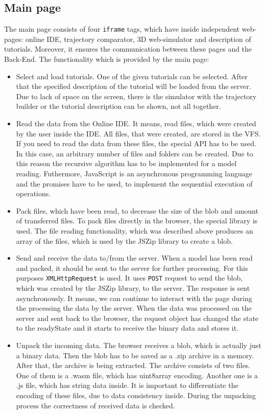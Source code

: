 \subsection{Main page}
The main page consists of four \texttt{iframe} tags, which have inside independent web-pages: online IDE, trajectory comparator, 3D web-simulator and description of tutorials. Moreover, it ensures the communication between these pages and the Back-End. The functionality which is provided by the main page:
\begin{itemize}
    \item Select and load tutorials. One of the given tutorials can be selected. After that the specified description of the tutorial will be loaded from the server. Due to lack of space on the screen, there is the simulator with the trajectory builder or the tutorial description can be shown, not all together.
    \item Read the data from the Online IDE. It means, read files, which were created by the user inside the IDE. All files, that were created, are stored in the VFS. If you need to read the data from these files, the special API \cite{FilesystemAPI} has to be used. In this case, an arbitrary number of files and folders can be created. Due to this reason the recursive algorithm has to be implemented for a model reading. Futhermore, JavaScript is an asynchronous programming language and the promises \cite{JSPromise} have to be used, to implement the sequential execution of operations.
    \item Pack files, which have been read, to decrease the size of the blob and amount of transferred files. To pack files directly in the browser, the special library is used. The file reading functionality, which was described above produces an array of the files, which is used by the JSZip library \cite{JSZip} to create a blob.
    \item Send and receive the data to/from the server. When a model has been read and packed, it should be sent to the server for further processing. For this purposes \texttt{XMLHttpRequest} \cite{XMLHttpRequest} is used. It uses \texttt{POST} request to send the blob, which was created by the JSZip library, to the server. The response is sent asynchronously. It means, we can continue to interact with the page during the processing the data by the server. When the data was processed on the server and sent back to the browser, the request object has changed the state to the readyState and it starts to receive the binary data and stores it.
    \item Unpack the incoming data. The browser receives a blob, which is actually just a binary data. Then the blob has to be saved as a .zip archive in a memory. After that, the archive is being extracted. The archive consists of two files. One of them is a .wasm file, which has uint8array encoding. Another one is a .js file, which has string data inside. It is important to differentiate the encoding of these files, due to data consistency inside. During the unpacking process the correctness of received data is checked.

\end{itemize}
